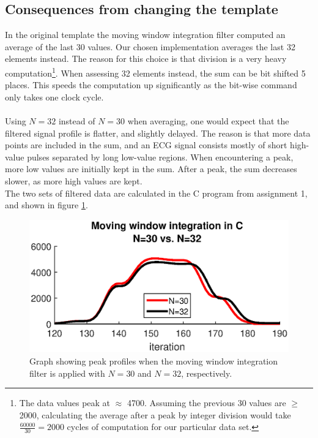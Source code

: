 \subsection{Consequences from changing the template}
\label{sec:conseq}

In the original template the moving window integration filter computed an average of the last 30 values. Our chosen implementation averages the last 32 elements instead. The reason for this choice is that division is a very heavy computation\footnote{The data values peak at $\approx$ 4700. Assuming the previous 30 values are $\geq$ 2000, calculating the average after a peak by integer division would take $\frac{60000}{30} = 2000$ cycles of computation for our particular data set.}. When assessing 32 elements instead, the sum can be bit shifted 5 places. This speeds the computation up significantly as the bit-wise command only takes one clock cycle. \\
\\
Using $N=32$ instead of $N=30$ when averaging, one would expect that the filtered signal profile is flatter, and slightly delayed. The reason is that more data points are included in the sum, and an ECG signal consists mostly of short high-value pulses separated by long low-value regions. When encountering a peak, more low values are initially kept in the sum. After a peak, the sum decreases slower, as more high values are kept.
\\
The two sets of filtered data are calculated in the C program from assignment 1, and shown in figure \ref{fig:points30}. 
 
\begin{figure}[H]
\centering
\includegraphics[width=1.0\textwidth]{2Implementation/fig/points30.eps}
\caption{Graph showing peak profiles when the moving window integration filter is applied with $N=30$ and $N=32$, respectively.}
\label{fig:points30}
\end{figure}

